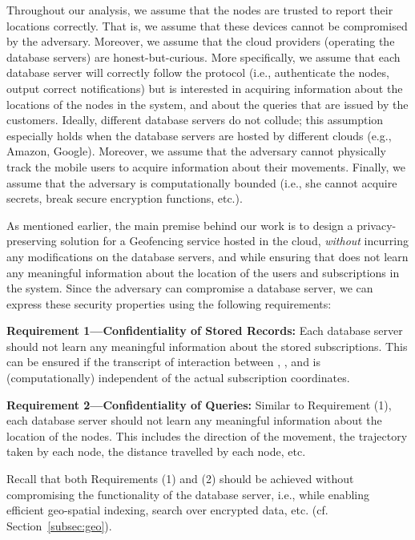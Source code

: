 \documentclass{llncs}
\begin{document}
Throughout our analysis, we assume that the nodes are trusted to report their locations correctly. That is, we assume that these devices cannot be compromised by the adversary.
Moreover, we assume that the cloud providers (operating the database servers) are honest-but-curious. More specifically, we assume that each database server will correctly follow the protocol (i.e., authenticate the nodes, output correct notifications) but is
interested in acquiring information about the locations of the nodes in the system, and about the queries that are issued by the customers. Ideally, different database servers do not collude; this assumption especially holds when the database servers
are hosted by different clouds (e.g., Amazon, Google). Moreover, we assume that the adversary cannot physically track the
mobile users to acquire information about their movements.
Finally, we assume that the adversary is computationally bounded (i.e., she cannot acquire secrets, break secure encryption functions, etc.).

As mentioned earlier, the main premise behind our work is to design a privacy-preserving solution for a Geofencing service hosted in the cloud, \emph{without} incurring any modifications on the database servers, and while
ensuring that  does not learn any meaningful information about the location of the users and subscriptions in the system. Since the adversary can compromise a database server, we can express
these security properties using the following requirements:

\vspace{1 em} \noindent \textbf{Requirement 1---Confidentiality of Stored Records:} Each database server should not learn any meaningful information about the stored subscriptions.
This can be ensured if the transcript of interaction between , , and  is (computationally) independent of the actual subscription coordinates.

\vspace{1 em} \noindent \textbf{Requirement 2---Confidentiality of Queries:} Similar to Requirement (1), each data\-base server should not learn any meaningful information about the location of the nodes.
This includes the direction of the movement, the trajectory taken by each node, the distance travelled by each node, etc.

Recall that both Requirements (1) and (2) should be achieved without compromising the functionality of the database server, i.e., while enabling efficient geo-spatial indexing, search over encrypted data, etc. (cf. Section~\ref{subsec:geo}).
\end{document}
